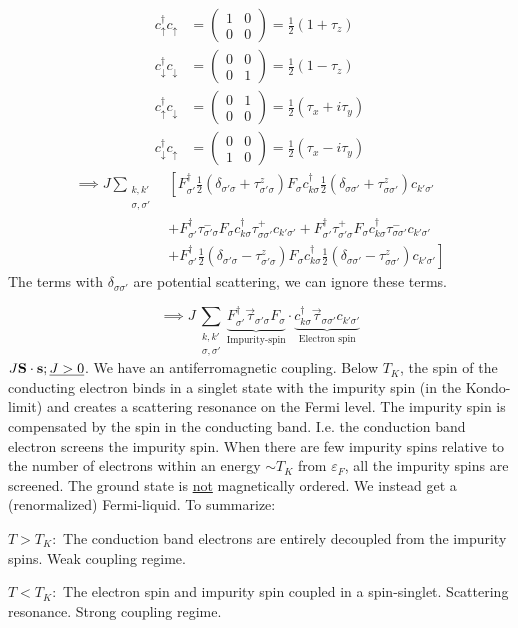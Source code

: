 \begin{align*}
c_\uparrow^\dagger c_\uparrow & = \begin{pmatrix}
1 & 0 \\ 0&0
\end{pmatrix}
 = \frac{1}{2}(1+\tau_z) \\
c_\downarrow^\dagger c_\downarrow & = \begin{pmatrix}
0 & 0 \\ 0&1
\end{pmatrix}
= \frac{1}{2}(1-\tau_z) \\
c_\uparrow^\dagger c_\downarrow & = \begin{pmatrix}
0 & 1 \\ 0&0
\end{pmatrix}
= \frac{1}{2}(\tau_x+ i\tau_y) \\
c_\downarrow^\dagger c_\uparrow & = \begin{pmatrix}
0 & 0 \\ 1&0
\end{pmatrix}
= \frac{1}{2}(\tau_x- i\tau_y)
\end{align*}
\begin{align*}
\implies  J\sum_{\substack{k,k' \\ \sigma,\sigma'}}&\left[ F_{\sigma'}^\dagger \frac{1}{2}\left(\delta_{\sigma'\sigma} + \tau_{\sigma'\sigma}^z\right)F_\sigma c_{k\sigma}^\dagger\frac{1}{2}\left(\delta_{\sigma\sigma'} + \tau_{\sigma\sigma'}^z\right)c_{k'\sigma'}\right. \\
&+ F_{\sigma'}^\dagger \tau_{\sigma'\sigma}^- F_\sigma c_{k\sigma}^\dagger\tau_{\sigma\sigma'}^+ c_{k'\sigma'} + F_{\sigma'}^\dagger \tau_{\sigma'\sigma}^+ F_\sigma c_{k\sigma}^\dagger \tau_{\sigma\sigma'}^- c_{k'\sigma'} \\
&+ \left.F_{\sigma'}^\dagger \frac{1}{2}\left(\delta_{\sigma'\sigma} - \tau_{\sigma'\sigma}^z\right)F_\sigma c_{k\sigma}^\dagger\frac{1}{2}\left(\delta_{\sigma\sigma'} - \tau_{\sigma\sigma'}^z\right)c_{k'\sigma'}\right]
\end{align*}
The terms with $\delta_{\sigma\sigma'}$ are potential scattering, we can ignore these terms.

\begin{equation}
	\implies J\sum_{\substack{k,k' \\ \sigma,\sigma'}} \underbrace{F_{\sigma'}^\dagger\vec{\tau}_{\sigma'\sigma}F_\sigma}_{\text{Impurity-spin}}\cdot \underbrace{c_{k\sigma}^\dagger\vec{\tau}_{\sigma\sigma'}c_{k'\sigma'}}_{\text{Electron spin}}
\end{equation}
$J\vb{S}\cdot\vb{s}; \underline{J>0}$. We have an antiferromagnetic coupling. Below $T_K$, the spin of the conducting electron binds in a singlet state with the impurity spin (in the Kondo-limit) and creates a scattering resonance on the Fermi level. The impurity spin is compensated by the spin in the conducting band. I.e. the conduction band electron screens the impurity spin. When there are few impurity spins relative to the number of electrons within an energy $\sim T_K$ from $\varepsilon_F$, all the impurity spins are screened.
The ground state is \underline{not} magnetically ordered. We instead get a (renormalized) Fermi-liquid.
To summarize:

\underline{$T>T_K:$} The conduction band electrons are entirely decoupled from the impurity spins. Weak coupling regime. 

\underline{$T<T_K:$} The electron spin and impurity spin coupled in a spin-singlet. Scattering resonance. Strong coupling regime. 